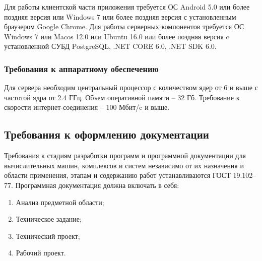 Для работы клиентской части приложения требуется ОС Android 5.0 или более поздняя версия или Windows 7 или более поздняя версия с установленным браузером Google Chrome.
Для работы серверных компонентов требуется ОС Windows 7 или Macos 12.0 или Ubuntu 16.0 или более поздняя версия c установленной СУБД PostgreSQL, .NET CORE 6.0, .NET SDK 6.0.

\subsubsection{Требования к аппаратному обеспечению}
Для сервера необходим центральный процессор с количеством ядер от 6 и выше с частотой ядра от 2.4 ГГц. Объем оперативной памяти – 32 Гб. Требование к скорости интернет-соединения – 100 Мбит/c и выше.

\subsection{Требования к оформлению документации}
Требования к стадиям разработки программ и программной документации для вычислительных машин, комплексов и систем независимо от их назначения и области применения, этапам и содержанию работ устанавливаются ГОСТ 19.102–77.
Программная документация должна включать в себя:

\begin{enumerate}
\item Анализ предметной области;
\item Техническое задание;
\item Технический проект;
\item Рабочий проект.
\end{enumerate}
